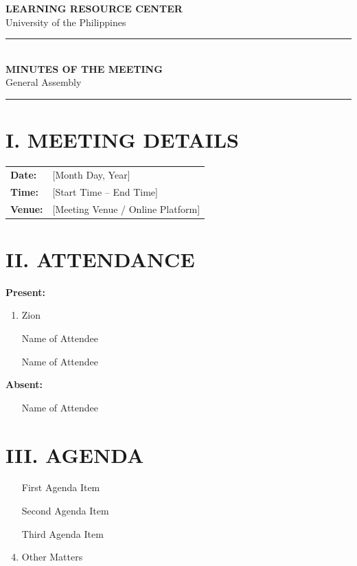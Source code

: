 \documentclass[11pt,a4paper]{article}
\begin{document}
\begin{center}
    {\Large\bfseries\color{navy} LEARNING RESOURCE CENTER}\\[2pt]
    {\small University of the Philippines}\\[8pt]
    {\color{navy}\rule{\textwidth}{1pt}}\\[8pt]
    {\LARGE\bfseries MINUTES OF THE MEETING}\\[2pt]
    {\normalsize General Assembly}\\[8pt]
    {\color{navy}\rule{\textwidth}{0.4pt}}
\end{center}

\section*{I. MEETING DETAILS}

\begin{tabularx}{\textwidth}{@{}>{\bfseries}p{3.5cm} X@{}}
Date:              & [Month Day, Year] \\
Time:              & [Start Time -- End Time] \\
Venue:             & [Meeting Venue / Online Platform] \\
\end{tabularx}

\section*{II. ATTENDANCE}

\textbf{Present:}
\begin{enumerate}
    \item Zion
    \item [Name of Attendee]
    \item [Name of Attendee]
\end{enumerate}

\textbf{Absent:}
\begin{enumerate}
    \item [Name of Attendee]
\end{enumerate}

\section*{III. AGENDA}

\begin{enumerate}
    \item [First Agenda Item]
    \item [Second Agenda Item]
    \item [Third Agenda Item]
    \item Other Matters
\end{enumerate}
\end{document}
